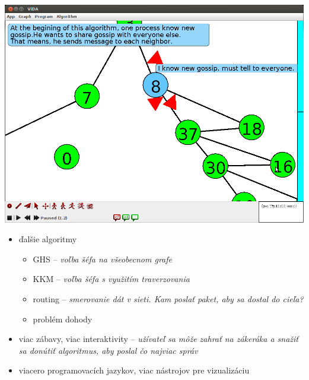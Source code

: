 
\includegraphics[width=\columnwidth]{bfs}





\begin{itemize}
    \item ďalšie algoritmy
    \begin{itemize}
        \item GHS -- \emph{voľba šéfa na všeobecnom grafe}
        \item KKM -- \emph{voľba šéfa s využitím traverzovania}
        \item routing -- \emph{smerovanie dát v sieti. Kam poslať paket, aby sa dostal do cieľa?}
        \item problém dohody
    \end{itemize}
    \item viac zábavy, viac interaktivity -- \emph{užívateľ sa môže zahrať na zákeráka a snažiť sa
    donútiť algoritmus, aby poslal čo najviac správ}
    \item viacero programovacích jazykov, viac nástrojov pre vizualizáciu
\end{itemize}

